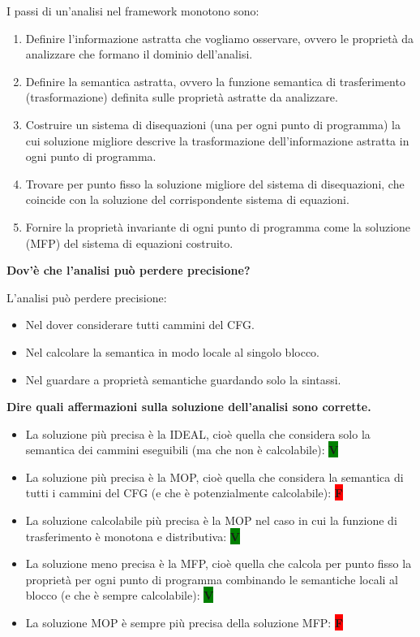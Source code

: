 \documentclass[a4paper,oneside,titlepage]{book}
\begin{document}
I passi di un'analisi nel framework monotono sono:
\begin{enumerate}
    \item Definire l'informazione astratta che vogliamo osservare, ovvero le proprietà da analizzare che formano il dominio dell'analisi.
    \item Definire la semantica astratta, ovvero la funzione semantica di trasferimento (trasformazione) definita sulle proprietà astratte da analizzare.
    \item Costruire un sistema di disequazioni (una per ogni punto di programma) la cui soluzione migliore descrive la trasformazione dell'informazione astratta in ogni punto di programma.
    \item Trovare per punto fisso la soluzione migliore del sistema di disequazioni, che coincide con la soluzione del corrispondente sistema di equazioni.
    \item Fornire la proprietà invariante di ogni punto di programma come la soluzione (MFP) del sistema di equazioni costruito.
\end{enumerate}
\noindent
\textbf{Dov'è che l'analisi può perdere precisione?}

L'analisi può perdere precisione:
\begin{itemize}
    \item Nel dover considerare tutti cammini del CFG.
    \item Nel calcolare la semantica in modo locale al singolo blocco.
    \item Nel guardare a proprietà semantiche guardando solo la sintassi.
\end{itemize}
\noindent
\textbf{Dire quali affermazioni sulla soluzione dell'analisi sono corrette.}
\begin{itemize}
    \item La soluzione più precisa è la IDEAL, cioè quella che considera solo la semantica dei cammini eseguibili (ma che non è calcolabile): \colorbox{green}{\textbf{V}}
    \item La soluzione più precisa è la MOP, cioè quella che considera la semantica di tutti i cammini del CFG (e che è potenzialmente calcolabile): \colorbox{red}{\textbf{F}}
    \item La soluzione calcolabile più precisa è la MOP nel caso in cui la funzione di trasferimento è monotona e distributiva: \colorbox{green}{\textbf{V}}
    \item La soluzione meno precisa è la MFP, cioè quella che calcola per punto fisso la proprietà per ogni punto di programma combinando le semantiche locali al blocco (e che è sempre calcolabile): \colorbox{green}{\textbf{V}}
    \item La soluzione MOP è sempre più precisa della soluzione MFP: \colorbox{red}{\textbf{F}}
\end{itemize}
\end{document}
